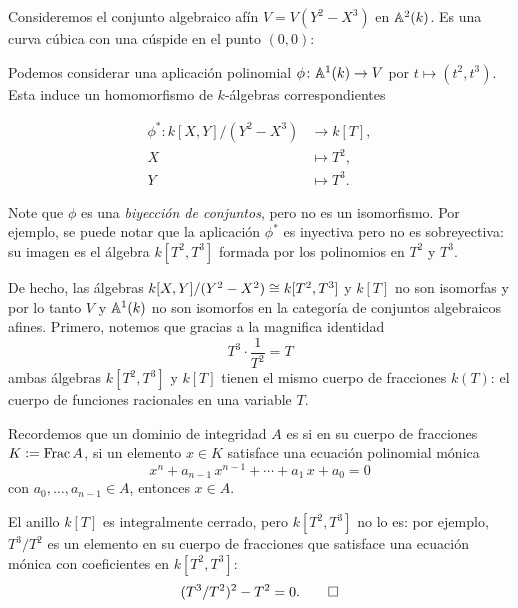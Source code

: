 \documentclass{article}
\numberwithin{equation}{section}
\theoremstyle{definition}
\begin{document}
\begin{ejemplo}
  Consideremos el conjunto algebraico afín $V = V (Y^2 - X^3)$ en
  $\AA^2 (k)$. Es una curva cúbica con una cúspide en el punto $(0,0)$:

  \begin{center}
  \end{center}

  Podemos considerar una aplicación polinomial $\phi\colon \AA^1 (k) \to V$ por
  $t \mapsto (t^2,t^3)$. Esta induce un homomorfismo de $k$-álgebras
  correspondientes

  \begin{align*}
    \phi^*\colon k[X,Y] / (Y^2-X^3) & \to k [T],\\
    X & \mapsto T^2,\\
    Y & \mapsto T^3.
  \end{align*}

  Note que $\phi$ es una \emph{biyección de conjuntos}, pero no es un
  isomorfismo. Por ejemplo, se puede notar que la aplicación $\phi^*$ es
  inyectiva pero no es sobreyectiva: su imagen es el álgebra $k [T^2,T^3]$
  formada por los polinomios en $T^2$ y $T^3$.

  De hecho, las álgebras $k[X,Y] / (Y^2-X^2) \isom k [T^2,T^3]$ y $k [T]$ no son
  isomorfas y por lo tanto $V$ y $\AA^1 (k)$ no son isomorfos en la categoría
  de conjuntos algebraicos afines. Primero, notemos que gracias a la magnifica
  identidad
  $$T^3\cdot\frac{1}{T^2} = T$$
  ambas álgebras $k [T^2,T^3]$ y $k [T]$ tienen el mismo cuerpo de fracciones
  $k (T)$: el cuerpo de funciones racionales en una variable $T$.

  Recordemos que un dominio de integridad $A$ es  si
  en su cuerpo de fracciones $K \dfn \Frac A$, si un elemento $x\in K$ satisface
  una ecuación polinomial mónica
  $$x^n + a_{n-1}\,x^{n-1} + \cdots + a_1\,x + a_0 = 0$$
  con $a_0,\ldots,a_{n-1} \in A$, entonces $x\in A$.

  El anillo $k [T]$ es integralmente cerrado, pero $k [T^2,T^3]$ no lo es:
  por ejemplo, $T^3/T^2$ es un elemento en su cuerpo de fracciones que satisface
  una ecuación mónica con coeficientes en $k[T^2,T^3]$:
  \[ (T^3/T^2)^2 - T^2 = 0. \qedhere \]
\end{ejemplo}
\end{document}
